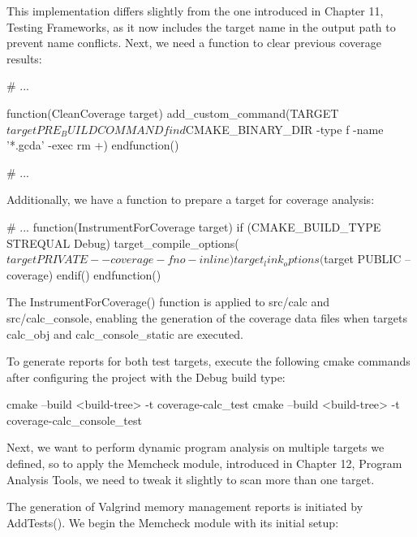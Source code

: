 This implementation differs slightly from the one introduced in Chapter 11, Testing Frameworks, as it now includes the target name in the output path to prevent name conflicts. Next, we need a function to clear previous coverage results:


\begin{cmake}
# ...

function(CleanCoverage target)
    add_custom_command(TARGET ${target} PRE_BUILD COMMAND
        find ${CMAKE_BINARY_DIR} -type f
        -name '*.gcda' -exec rm {} +)
endfunction()

# ...
\end{cmake}

Additionally, we have a function to prepare a target for coverage analysis:


\begin{cmake}
# ...
function(InstrumentForCoverage target)
    if (CMAKE_BUILD_TYPE STREQUAL Debug)
        target_compile_options(${target}
                               PRIVATE --coverage -fno-inline)
        target_link_options(${target} PUBLIC --coverage)
    endif()
endfunction()
\end{cmake}

The InstrumentForCoverage() function is applied to src/calc and src/calc\_console, enabling the generation of the coverage data files when targets calc\_obj and calc\_console\_static are executed.

To generate reports for both test targets, execute the following cmake commands after configuring the project with the Debug build type:

\begin{shell}
cmake --build <build-tree> -t coverage-calc_test
cmake --build <build-tree> -t coverage-calc_console_test
\end{shell}

Next, we want to perform dynamic program analysis on multiple targets we defined, so to apply the Memcheck module, introduced in Chapter 12, Program Analysis Tools, we need to tweak it slightly to scan more than one target.


The generation of Valgrind memory management reports is initiated by AddTests(). We begin the Memcheck module with its initial setup:

